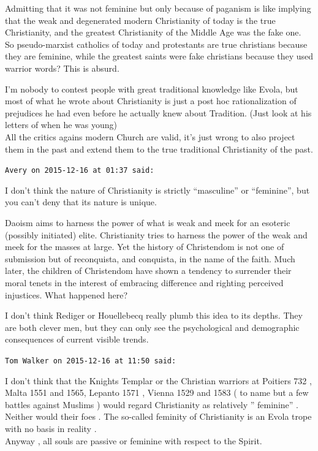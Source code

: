 \begin{footnotesize}
\begin{sffamily}
Admitting that it was not feminine but only because of paganism is like implying that the weak and degenerated modern Christianity of today is the true Christianity, and the greatest Christianity of the Middle Age was the fake one.\\ So pseudo-marxist catholics of today and protestants are true christians because they are feminine, while the greatest saints were fake christians because they used warrior words? This is absurd.

I'm nobody to contest people with great traditional knowledge like Evola, but most of what he wrote about Christianity is just a post hoc rationalization of prejudices he had even before he actually knew about Tradition. (Just look at his letters of when he was young)\\ All the critics agains modern Church are valid, it's just wrong to also project them in the past and extend them to the true traditional Christianity of the past.

\hfill

\texttt{Avery on 2015-12-16 at 01:37 said:}

I don't think the nature of Christianity is strictly ``masculine'' or ``feminine'', but you can't deny that its nature is unique.

Daoism aims to harness the power of what is weak and meek for an esoteric (possibly initiated) elite. Christianity tries to harness the power of the weak and meek for the masses at large. Yet the history of Christendom is not one of submission but of reconquista, and conquista, in the name of the faith. Much later, the children of Christendom have shown a tendency to surrender their moral tenets in the interest of embracing difference and righting perceived injustices. What happened here?

I don't think Rediger or Houellebecq really plumb this idea to its depths. They are both clever men, but they can only see the psychological and demographic consequences of current visible trends.

\hfill

\texttt{Tom Walker on 2015-12-16 at 11:50 said:}

I don't think that the Knights Templar or the Christian warriors at Poitiers 732 , Malta 1551 and 1565, Lepanto 1571 , Vienna 1529 and 1583 ( to name but a few battles against Muslims ) would regard Christianity as relatively '' feminine'' . Neither would their foes . The so-called feminity of Christianity is an Evola trope with no basis in reality .\\ Anyway , all souls are passive or feminine with respect to the Spirit.


\end{sffamily}
\end{footnotesize}
